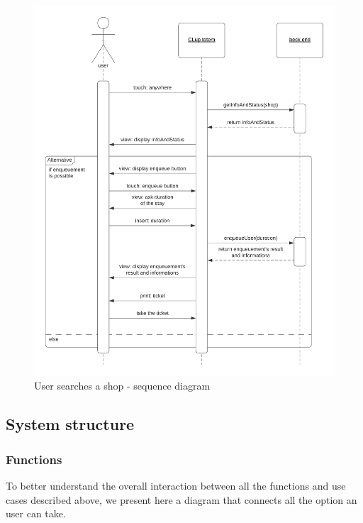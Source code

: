 \begin{figure}[h!]
    \centering
    \includegraphics[width=\textwidth]{Images/sequencediagrams/CustomerlinesupSD.png}
    \caption{\label{fig:customerlinesup}User searches a shop - sequence diagram}
\end{figure}

\clearpage
\subsection{System structure}
\label{subsect:systemstructure}

\subsubsection{Functions}
\label{subsubsect:functionsstructure}

To better understand the overall interaction between all the functions and use cases described above, we present here a diagram that connects all the option an user can take.

